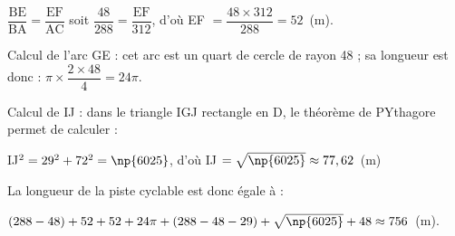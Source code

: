 $\dfrac{\text{BE}}{\text{BA}} =  \dfrac{\text{EF}}{\text{AC}}$ soit $\dfrac{48}{288} =  \dfrac{\text{EF}}{312}$, d'où EF $ = \dfrac{48 \times 312}{288} = 52$~(m).

Calcul de l'arc GE : cet arc est un quart de cercle de rayon 48 ; sa longueur est donc : $\pi \times \dfrac{2\times 48}{4} = 24\pi$.

Calcul de IJ : dans le triangle IGJ rectangle en D, le théorème de PYthagore permet de calculer :

IJ$^2 = 29^2 + 72^2 = \np{6025}$, d'où IJ $ = \sqrt{\np{6025}} \approx 77,62$~(m)

La longueur de la piste cyclable est donc égale à :

$(288 - 48) + 52 + 52 + 24\pi + (288 - 48 - 29) + \sqrt{\np{6025}} + 48 \approx 756$~(m).
